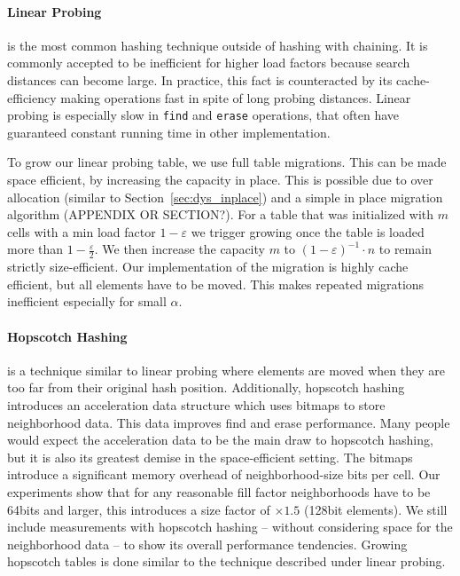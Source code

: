 \documentclass[a4paper,UKenglish]{lipics-v2016}
\begin{document}
\paragraph*{Linear Probing} is the most common hashing technique outside of
hashing with chaining.  It is commonly accepted to be inefficient for
higher load factors because search distances can become large.  In
practice, this fact is counteracted by its cache-efficiency making
operations fast in spite of long probing distances.  Linear probing is
especially slow in \verb~find~ and \verb~erase~ operations, that often have
guaranteed constant running time in other implementation.

To grow our linear probing table, we use full table migrations.  This
can be made space efficient, by increasing the capacity in place.
This is possible due to over allocation (similar to
Section~\ref{sec:dys_inplace}) and a simple in place migration
algorithm (APPENDIX OR SECTION?).  For a table that was
initialized with $m$ cells with a min load factor $1-\varepsilon$ we
trigger growing once the table is loaded more than
$1-\frac{\varepsilon}{2}$. We then increase the capacity $m$ to
$(1-\varepsilon)^{-1}\cdot n$ to remain strictly size-efficient.  Our implementation
of the migration is highly cache efficient, but all elements have to
be moved.  This makes repeated migrations inefficient especially for
small $\alpha$.

\paragraph*{Hopscotch Hashing} is a technique similar to linear probing where
elements are moved when they are too far from their original hash
position.  Additionally, hopscotch hashing introduces an acceleration
data structure which uses bitmaps to store neighborhood data. This
data improves find and erase performance.  Many people would expect
the acceleration data to be the main draw to hopscotch hashing, but it
is also its greatest demise in the space-efficient setting.  The
bitmaps introduce a significant memory overhead of neighborhood-size
bits per cell.  Our experiments show that for any reasonable fill
factor neighborhoods have to be 64bits and larger, this introduces a
size factor of $\times1.5$ (128bit elements).  We still include
measurements with hopscotch hashing -- without considering space for
the neighborhood data -- to show its overall performance tendencies.
Growing hopscotch tables is done similar to the technique described
under linear probing.
\end{document}
